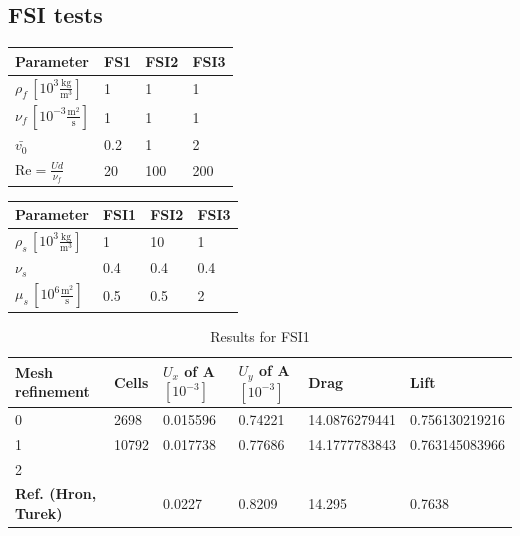\subsection{FSI tests}

\begin{table}[!ht]
\begin{center}
  \begin{tabular}{l | l | l | l} \hline
	Parameter & FS1 & FSI2 & FSI3 \\ \hline
    $\rho_f\, [10^3\frac{\text{kg}}{\text{m}^3}]$  & 1 & 1 & 1 \\   \hline
    $\nu_f\, [10^{-3}\frac{\text{m}^2}{\text{s}}]$ & 1 & 1 & 1 \\ \hline
    $\bar{v_0}$ & 0.2 & 1 & 2   \\ \hline \hline
    $\text{Re} = \frac{Ud}{\nu_f}$ & 20 & 100 & 200 \\ \hline
    \hline
  \end{tabular}
\end{center}
\end{table}

\begin{table}[!ht]
\begin{center}
  \begin{tabular}{l | l | l | l} \hline
	Parameter & FSI1 & FSI2 & FSI3 \\ \hline
    $\rho_s \,[10^3\frac{\text{kg}}{\text{m}^3}]$  & 1 & 10 & 1 \\   \hline
    $\nu_s $ & 0.4 & 0.4 & 0.4 \\ \hline
    $\mu_s \,[10^{6}\frac{\text{m}^2}{\text{s}}]$ & 0.5 & 0.5 & 2   \\ \hline \hline
  \end{tabular}
\end{center}
\end{table}
\begin{table}[!ht]
\begin{center}
  \begin{tabular}{l | l | l | l | l | l} \hline
	Mesh refinement & Cells & $U_x$ of A $[10^{-3}]$ & $U_y$ of A $[10^{-3}]$ & Drag & Lift\\ \hline
    0  & 2698 & 0.015596 & 0.74221 & 14.0876279441 & 0.756130219216 \\   \hline
    1 & 10792 & 0.017738 & 0.77686 & 14.1777783843 & 0.763145083966 \\ \hline
    2 &  & $ $&  $ $ & $ $ & $ $   \\ \hline \hline
    \textbf{Ref. (Hron, Turek)}  & & 0.0227 & 0.8209 & 14.295 & 0.7638\\ \hline 
    \hline
  \end{tabular}	
\caption{Results for FSI1}
\end{center}
\end{table}

